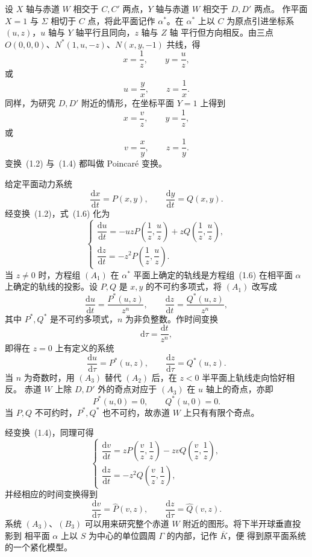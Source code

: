 
设 $X$ 轴与赤道 $W$ 相交于 $C,C'$ 两点，$Y$ 轴与赤道 $W$ 相交于 $D,D'$ 两点。
作平面 $X=1$ 与 $\Sigma$ 相切于 $C$ 点，将此平面记作 $\alpha^*$。在 $\alpha^*$
上以 $C$ 为原点引进坐标系 $(u,z)$，$u$ 轴与 $Y$ 轴平行且同向，$z$ 轴与 $Z$ 轴
平行但方向相反。由三点 $O(0,0,0)$、$N^*(1,u,-z)$、$N(x,y,-1)$ 共线，得
\[
  x=\dfrac{1}{z},\qquad y=\dfrac{u}{z}, \tag{1.2}
\]
或
\[
  u=\dfrac{y}{x},\qquad z=\dfrac{1}{x}. \tag{1.3}
\]
同样，为研究 $D,D'$ 附近的情形，在坐标平面 $Y=1$ 上得到
\[
  x=\dfrac{v}{z},\qquad y=\dfrac{1}{z}, \tag{1.4}
\]
或
\[
  v=\dfrac{x}{y},\qquad z=\dfrac{1}{y}. \tag{1.5}
\]
变换~(1.2) 与~(1.4) 都叫做 Poincar\'e 变换。

给定平面动力系统
\[
  \dfrac{\mathrm{d}x}{\mathrm{d}t}=P(x,y),\qquad
  \dfrac{\mathrm{d}y}{\mathrm{d}t}=Q(x,y). \tag{1.6}
\]
经变换~(1.2)，式~(1.6) 化为
\[
  \begin{cases}
    \dfrac{\mathrm{d}u}{\mathrm{d}t}=-uzP\left(\dfrac{1}{z},\dfrac{u}{z}\right)
      +zQ\left(\dfrac{1}{z},\dfrac{u}{z}\right),\\[4pt]
    \dfrac{\mathrm{d}z}{\mathrm{d}t}=-z^2P\left(\dfrac{1}{z},\dfrac{u}{z}\right).
  \end{cases} \tag{A$_1$}
\]
当 $z\ne0$ 时，方程组 $(A_1)$ 在 $\alpha^*$ 平面上确定的轨线是方程组~(1.6)
在相平面 $\alpha$ 上确定的轨线的投影。设 $P,Q$ 是 $x,y$ 的不可约多项式，将
$(A_1)$ 改写成
\[
  \dfrac{\mathrm{d}u}{\mathrm{d}t}=\dfrac{P^*(u,z)}{z^n},\qquad
  \dfrac{\mathrm{d}z}{\mathrm{d}t}=\dfrac{Q^*(u,z)}{z^n}, \tag{A$_2$}
\]
其中 $P^*,Q^*$ 是不可约多项式，$n$ 为非负整数。作时间变换
\[
  \mathrm{d}\tau=\dfrac{\mathrm{d}t}{z^n},
\]
即得在 $z=0$ 上有定义的系统
\[
  \dfrac{\mathrm{d}u}{\mathrm{d}\tau}=P^*(u,z),\qquad
  \dfrac{\mathrm{d}z}{\mathrm{d}\tau}=Q^*(u,z). \tag{A$_3$}
\]
当 $n$ 为奇数时，用 $(A_3)$ 替代 $(A_2)$ 后，在 $z<0$ 半平面上轨线走向恰好相反。
赤道 $W$ 上除 $D,D'$ 外的奇点对应于 $(A_3)$ 在 $u$ 轴上的奇点，亦即
\[
  P^*(u,0)=0,\qquad Q^*(u,0)=0.
\]
当 $P,Q$ 不可约时，$P^*,Q^*$ 也不可约，故赤道 $W$ 上只有有限个奇点。

经变换~(1.4)，同理可得
\[
  \begin{cases}
    \dfrac{\mathrm{d}v}{\mathrm{d}t}=zP\left(\dfrac{v}{z},\dfrac{1}{z}\right)
      -zvQ\left(\dfrac{v}{z},\dfrac{1}{z}\right),\\[4pt]
    \dfrac{\mathrm{d}z}{\mathrm{d}t}=-z^2Q\left(\dfrac{v}{z},\dfrac{1}{z}\right),
  \end{cases} \tag{B$_1$}
\]
并经相应的时间变换得到
\[
  \dfrac{\mathrm{d}v}{\mathrm{d}\tau}=\widehat P(v,z),\qquad
  \dfrac{\mathrm{d}z}{\mathrm{d}\tau}=\widehat Q(v,z). \tag{B$_3$}
\]
系统 $(A_3)$、$(B_3)$ 可以用来研究整个赤道 $W$ 附近的图形。将下半开球垂直投影到
相平面 $\alpha$ 上以 $S$ 为中心的单位圆周 $\Gamma$ 的内部，记作 $\overline K$，便
得到原平面系统的一个紧化模型。

